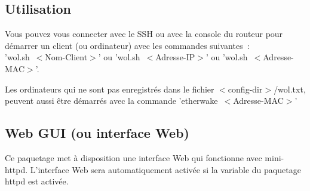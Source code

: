 \subsection{Utilisation}

Vous pouvez vous connecter avec le SSH ou avec la console du routeur pour
démarrer un client (ou ordinateur) avec les commandes suivantes~:\\
'wol.sh~$<$Nom-Client$>$' ou 'wol.sh~$<$Adresse-IP$>$' ou 'wol.sh~$<$Adresse-MAC$>$'.

Les ordinateurs qui ne sont pas enregistrés dans le fichier $<$config-dir$>$/wol.txt,
peuvent aussi être démarrés avec la commande 'etherwake~$<$Adresse-MAC$>$'

\subsection {Web GUI (ou interface Web)}

    Ce paquetage met à disposition une interface Web qui fonctionne avec mini-httpd. 
    L'interface Web sera automatiquement activée si la variable 
	du paquetage httpd est activée.

